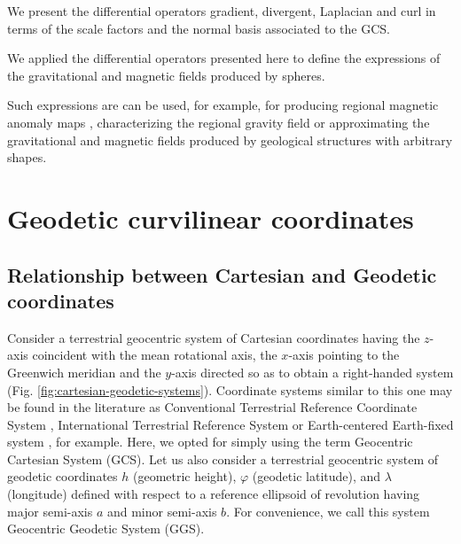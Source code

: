 \documentclass[mreferee]{gji}
\begin{document}
We present the differential operators gradient, divergent,
Laplacian and curl in terms of the scale factors and the
normal basis associated to the GCS.

We applied the differential operators presented here to
define the expressions of the gravitational and magnetic fields
produced by spheres.

Such expressions are can be used, for example, for producing regional
magnetic anomaly maps \citep[e.g.,][]{vonfrese-etal1981, mayhew1982, dyment1998},
characterizing the regional gravity field \citep[e.g.,][]{needham1970, balmino1972,
barthelmes1991, barthelmes1991b, lehmann1993, antunes2003, guspi2004, lin2014} or
approximating the gravitational and magnetic fields produced by geological
structures with arbitrary shapes.



\section{Geodetic curvilinear coordinates}


\subsection{Relationship between Cartesian and Geodetic coordinates}


Consider a terrestrial geocentric system of Cartesian coordinates
having the $z$-axis coincident with the mean rotational axis,
the $x$-axis pointing to the Greenwich meridian and the $y$-axis
directed so as to obtain a right-handed system
(Fig. \ref{fig:cartesian-geodetic-systems}).
Coordinate systems similar to this one may be found in the literature as
Conventional Terrestrial Reference Coordinate System \citep[e.g.,][]{soler1988}, 
International Terrestrial Reference System \citep[e.g.,][]{seeber2003, torge2012} 
or Earth-centered Earth-fixed system \citep[e.g.,][]{bouman2013}, for example.
Here, we opted for simply using the term Geocentric Cartesian System
(GCS).
Let us also consider a terrestrial geocentric system of geodetic coordinates
$h$ (geometric height), $\varphi$ (geodetic latitude), and 
$\lambda$ (longitude) defined with respect to a reference ellipsoid
of revolution having major semi-axis $a$ and minor semi-axis $b$.
For convenience, we call this system Geocentric Geodetic System
(GGS).
\end{document}
